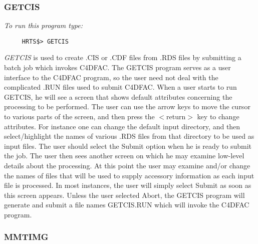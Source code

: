 \subsubsection{GETCIS}

{\em To run this program type:}
\begin{verbatim}
     HRTS$> GETCIS
\end{verbatim}
{\em GETCIS} is used to create .CIS or .CDF files from .RDS files by
   submitting a batch job which invokes C4DFAC.  The GETCIS program serves
   as a user interface to the C4DFAC program, so the user need not deal
   with the complicated .RUN files used to submit C4DFAC.  When a user
   starts to run GETCIS, he will see a screen that shows default
   attributes concerning the processing to be performed.
   The user can use the arrow keys to move the cursor to various parts
   of the screen, and then press the $<$return$>$ key to change attributes.
   For instance one can change the default input directory, and then
   select/highlight the names of various .RDS files from that directory to
   be used as input files.  The user should select the Submit option when
   he is ready to submit the job.
      The user then sees another screen on which he may examine low-level
   details about the processing.
   At this point the user may examine and/or change the names of files
   that will be used to supply accessory information as each input file is
   processed.  In most instances, the user will simply select Submit as
   soon as this screen appears.
   Unless the user selected Abort, the GETCIS program will generate and
   submit a file names GETCIS.RUN which will invoke the C4DFAC program.

\subsubsection{MMTIMG}

